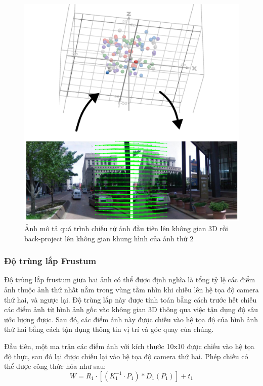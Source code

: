 \begin{figure}
  \centering
  \includegraphics[width=\textwidth]{pics/Proposal/project.drawio.png}
  \caption[Quá trình chiếu giữa 2 ảnh]{Ảnh mô tả quá trình chiếu từ ảnh đầu tiên lên không gian 3D rồi back-project lên không gian khung hình của ảnh thứ 2}
\end{figure}

\subsubsection*{Độ trùng lắp Frustum}

Độ trùng lắp frustum giữa hai ảnh có thể được định nghĩa là tổng tỷ lệ các điểm ảnh thuộc ảnh thứ nhất nằm trong vùng tầm nhìn khi chiếu lên hệ tọa độ camera thứ hai, và ngược lại. Độ trùng lắp này được tính toán bằng cách trước hết chiếu các điểm ảnh từ hình ảnh gốc vào không gian 3D thông qua việc tận dụng độ sâu ước lượng được. Sau đó, các điểm ảnh này được chiếu vào hệ tọa độ của hình ảnh thứ hai bằng cách tận dụng thông tin vị trí và góc quay của chúng.

Đầu tiên, một ma trận các điểm ảnh với kích thước 10x10 được chiếu vào hệ tọa độ thực, sau đó lại được chiếu lại vào hệ tọa độ camera thứ hai. Phép chiếu có thể được công thức hóa như sau:
$$
W = R_1\cdot \left[(K_1^{-1} \cdot P_1)*D_1(P_1)\right] + t_1
$$

